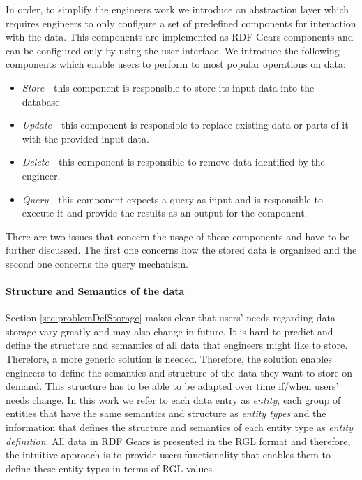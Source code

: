 In order, to simplify the engineers work we introduce an abstraction layer which requires engineers to only configure a set of predefined components for interaction with the data. This components are implemented as RDF Gears components and can be configured only by using the user interface. We introduce the following components which enable users to perform to most popular operations on data:

\begin{itemize}
	\item \textit{Store} - this component is responsible to store its input data into the database.
	\item \textit{Update} - this component is responsible to replace existing data or parts of it with the provided input data.
	\item \textit{Delete} - this component is responsible to remove data identified by the engineer.
	\item \textit{Query} - this component expects a query as input and is responsible to execute it and provide the results as an output for the component.
\end{itemize}

There are two issues that concern the usage of these components and have to be further discussed. The first one concerns how the stored data is organized and the second one concerns the query mechanism.

\paragraph{Structure and Semantics of the data}
Section \ref{sec:problemDefStorage} makes clear that users' needs regarding data storage vary greatly and may also change in future. It is hard to predict and define the structure and semantics of all data that engineers might like to store. Therefore, a more generic solution is needed. Therefore, the solution enables engineers to define the semantics and structure of the data they want to store on demand. This structure has to be able to be adapted over time if/when users' needs change. In this work we refer to each data entry as \textit{entity}, each group of entities that have the same semantics and structure as \textit{entity types} and the information that defines the structure and semantics of each entity type as \textit{entity definition}. All data in RDF Gears is presented in the RGL format and therefore, the intuitive approach is to provide users functionality that enables them to define these entity types in terms of RGL values. 

